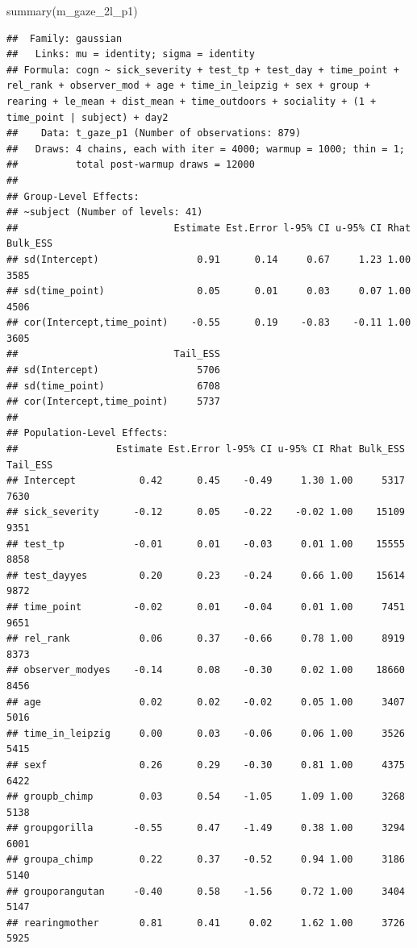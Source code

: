 \documentclass[
]{article}
\newenvironment{Shaded}{\begin{snugshade}}{\end{snugshade}}
\newcommand{\FunctionTok}[1]{\textcolor[rgb]{0.00,0.00,0.00}{#1}}
\newcommand{\NormalTok}[1]{#1}
\begin{document}
\begin{Shaded}
\begin{Highlighting}[]
\FunctionTok{summary}\NormalTok{(m\_gaze\_2l\_p1)}
\end{Highlighting}
\end{Shaded}

\begin{verbatim}
##  Family: gaussian 
##   Links: mu = identity; sigma = identity 
## Formula: cogn ~ sick_severity + test_tp + test_day + time_point + rel_rank + observer_mod + age + time_in_leipzig + sex + group + rearing + le_mean + dist_mean + time_outdoors + sociality + (1 + time_point | subject) + day2 
##    Data: t_gaze_p1 (Number of observations: 879) 
##   Draws: 4 chains, each with iter = 4000; warmup = 1000; thin = 1;
##          total post-warmup draws = 12000
## 
## Group-Level Effects: 
## ~subject (Number of levels: 41) 
##                           Estimate Est.Error l-95% CI u-95% CI Rhat Bulk_ESS
## sd(Intercept)                 0.91      0.14     0.67     1.23 1.00     3585
## sd(time_point)                0.05      0.01     0.03     0.07 1.00     4506
## cor(Intercept,time_point)    -0.55      0.19    -0.83    -0.11 1.00     3605
##                           Tail_ESS
## sd(Intercept)                 5706
## sd(time_point)                6708
## cor(Intercept,time_point)     5737
## 
## Population-Level Effects: 
##                 Estimate Est.Error l-95% CI u-95% CI Rhat Bulk_ESS Tail_ESS
## Intercept           0.42      0.45    -0.49     1.30 1.00     5317     7630
## sick_severity      -0.12      0.05    -0.22    -0.02 1.00    15109     9351
## test_tp            -0.01      0.01    -0.03     0.01 1.00    15555     8858
## test_dayyes         0.20      0.23    -0.24     0.66 1.00    15614     9872
## time_point         -0.02      0.01    -0.04     0.01 1.00     7451     9651
## rel_rank            0.06      0.37    -0.66     0.78 1.00     8919     8373
## observer_modyes    -0.14      0.08    -0.30     0.02 1.00    18660     8456
## age                 0.02      0.02    -0.02     0.05 1.00     3407     5016
## time_in_leipzig     0.00      0.03    -0.06     0.06 1.00     3526     5415
## sexf                0.26      0.29    -0.30     0.81 1.00     4375     6422
## groupb_chimp        0.03      0.54    -1.05     1.09 1.00     3268     5138
## groupgorilla       -0.55      0.47    -1.49     0.38 1.00     3294     6001
## groupa_chimp        0.22      0.37    -0.52     0.94 1.00     3186     5140
## grouporangutan     -0.40      0.58    -1.56     0.72 1.00     3404     5147
## rearingmother       0.81      0.41     0.02     1.62 1.00     3726     5925

\end{verbatim}
\end{document}
